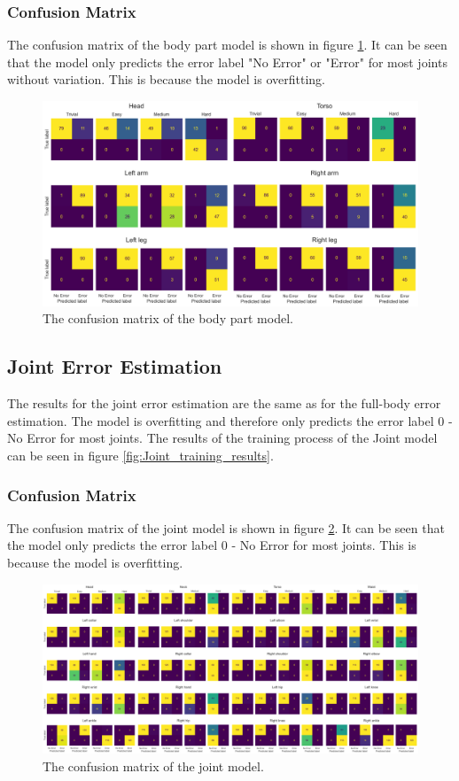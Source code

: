 \subsubsection{Confusion Matrix}

The confusion matrix of the body part model is shown in figure \ref{fig:body part_confusion_matrix}. It can be seen that the model only predicts the error label "No Error" or "Error" for most joints without variation. This is because the model is overfitting.

\begin{figure}[ht]
  \centering
  \includegraphics[width=\textwidth]{figures/results/confusion/limbs.png}
  \caption[Body part model confusion matrix]{The confusion matrix of the body part model.}
  \label{fig:body part_confusion_matrix}
\end{figure}

\subsection{Joint Error Estimation}
\label{sec:joint_error_estimation}

The results for the joint error estimation are the same as for the full-body error estimation. The model is overfitting and therefore only predicts the error label $0$ - No Error for most joints. The results of the training process of the Joint model can be seen in figure \ref{fig:Joint_training_results}.

\subsubsection{Confusion Matrix}

The confusion matrix of the joint model is shown in figure \ref{fig:joint_confusion_matrix}. It can be seen that the model only predicts the error label $0$ - No Error for most joints. This is because the model is overfitting.

\begin{figure}[ht]
  \centering
  \includegraphics[width=\textwidth]{figures/results/confusion/joints.png}
  \caption[Joint model confusion matrix]{The confusion matrix of the joint model.}
  \label{fig:joint_confusion_matrix}
\end{figure}